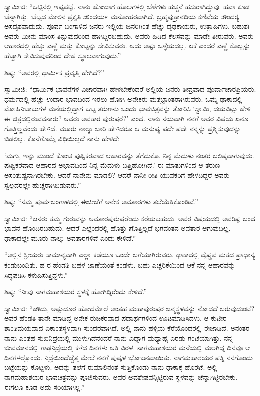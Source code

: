 \vskip 2pt

 ಸ್ವಾಮೀಜಿ: “ಒಟ್ಟಿನಲ್ಲಿ ಇಷ್ಟಪಟ್ಟೆ. ನಾನು ಹೋದಾಗ ಹೊಲಗಳಲ್ಲಿ ಬೆಳೆಗಳು ಹಚ್ಚನೆ ಹಸುರಾಗಿದ್ದುವು. ಹವಾ ಕೂಡ ಚೆನ್ನಾಗಿತ್ತು. ಬೆಟ್ಟದ ಮೇಲಿನ ಪ್ರಕೃತಿ ಸೌಂದರ್ಯ ಮನೋಹರವಾಗಿದೆ. ಬ್ರಹ್ಮಪುತ್ರಾನದಿಯ ಕಣಿವೆಯ ಸೌಂದರ‍್ಯ ಅಸದೃಶವಾದುದು. ಪೂರ್ವ ಬಂಗಾಳಿದ ಜನರು ಇಲ್ಲಿಯ ಜನರಿಗಿಂತ ಹೆಚ್ಚು ದೃಢಕಾಯರು, ಉತ್ಸಾಹಿಗಳು. ಬಹುಶಃ ಅವರು ಮೀನು ಮಾಂಸ ತಿನ್ನುವುದರಿಂದ ಹಾಗಿದ್ದಿರಬಹುದು. ಅವರು ಹಿಡಿದ ಕೆಲಸವನ್ನು ಮಾಡೇ ತೀರುವರು. ಅವರು ಆಹಾರದಲ್ಲಿ ಹೆಚ್ಚು ಎಣ್ಣೆ ಮತ್ತು ಕೊಬ್ಬನ್ನು ಸೇವಿಸುವರು. ಅದು ಅಷ್ಟು ಒಳ್ಳೆಯದಲ್ಲ. ಏಕೆ ಎಂದರೆ ಎಣ್ಣೆ ಕೊಬ್ಬನ್ನು ಹೆಚ್ಚಾಗಿ ಸೇವಿಸುವುದರಿಂದ ದೇಹ ಸ್ಥೂಲವಾಗುವುದು.” 

\vskip 2pt

 ಶಿಷ್ಯ: “ಅವರಲ್ಲಿ ಧಾರ್ಮಿಕ ಪ್ರವೃತ್ತಿ ಹೇಗಿದೆ?” 

\vskip 2pt

 ಸ್ವಾಮೀಜಿ: “ಧಾರ್ಮಿಕ ಭಾವನೆಗಳ ವಿಚಾರವಾಗಿ ಹೇಳಬೇಕೆಂದರೆ ಅಲ್ಲಿಯ ಜನರು ತೀವ್ರವಾದ ಪೂರ್ವಾಚಾರಪ್ರಿಯರು. ಧರ್ಮದಲ್ಲಿ ಹೆಚ್ಚು ಉದಾರ ಭಾವದಿಂದ ಇರಲು ಹೋಗಿ ಅನೇಕರು ಮತಭ್ರಾಂತರಾಗಿರುವರು. ಒಮ್ಮೆ ಢಾಕಾದಲ್ಲಿ ಮೋಹಿನಿಬಾಬುಗಳ ಮನೆಯಲ್ಲಿದ್ದಾಗ ಒಬ್ಬ ತರುಣನು ಒಂದು ಭಾವಚಿತ್ರವನ್ನು ತೋರಿಸಿ ‘ಸ್ವಾಮಿ, ದಯವಿಟ್ಟು ಹೇಳಿ ಈ ಚಿತ್ರದಲ್ಲಿರುವವನಾರು? ಅವರು ಅವತಾರ ಪುರುಷರೆ?’ ಎಂದ. ನಾನು ನಯವಾಗಿ ನನಗೆ ಅವರ ವಿಷಯ ಏನೂ ಗೊತ್ತಿಲ್ಲವೆಂದು ಹೇಳಿದೆ. ಮೂರು ನಾಲ್ಕು ಬಾರಿ ಹೇಳಿದರೂ ಆ ಮನುಷ್ಯ ಪದೇ ಪದೇ ನನ್ನನ್ನು ಪ್ರಶ್ನಿಸುವುದನ್ನು ಬಿಡಲಿಲ್ಲ. ಕೊನೆಗೊಮ್ಮೆ ವಿಧಿಯಿಲ್ಲದೆ ನಾನು ಹೇಳಿದೆ: 

\vskip 2pt

 ‘ಮಗು, ಇನ್ನು ಮುಂದೆ ಕೊಂಚ ಪುಷ್ಟಿಕರವಾದ ಆಹಾರವನ್ನು ತೆಗೆದುಕೊ. ನಿನ್ನ ಮೆದುಳು ನಂತರ ಬಲಿಷ್ಠವಾಗುವುದು. ಪುಷ್ಟಿಕರವಾದ ಆಹಾರದ ಅಭಾವದಿಂದ ನಿನ್ನ ಮೆದುಳು ಬತ್ತಿಹೋಗಿದೆ.’ ಈ ಮಾತುಗಳಿಂದ ಆ ತರುಣ ಅಸಂತುಷ್ಟನಾಗಿರಬೇಕು. ಆದರೆ ನಾನೇನು ಮಾಡಲಿ? ಆದರೆ ನಾನೀ ರೀತಿ ಯುವಕರಿಗೆ ಹೇಳದಿದ್ದರೆ ಅವರು ಸ್ವಲ್ಪದರಲ್ಲೇ ಹುಚ್ಚರಾಗಿಬಿಡುವರು.” 

 ಶಿಷ್ಯ: “ನಮ್ಮ ಪೂರ್ವಬಂಗಾಳದಲ್ಲಿ ಈಚೀಚೆಗೆ ಅನೇಕ ಅವತಾರಗಳು ತಲೆಯೆತ್ತಿಕೊಂಡಿವೆ.” 

 ಸ್ವಾಮೀಜಿ: “ಜನರು ತಮ್ಮ ಗುರುವನ್ನು ಅವತಾರಪುರುಷರೆಂದು ಕರೆಯಬಹುದು. ಅವರ ವಿಷಯದಲ್ಲಿ ಅವರಿಷ್ಟ ಬಂದ ಭಾವನೆ ಹೊಂದಿರಬಹುದು. ಆದರೆ ಎಲ್ಲೆಂದರಲ್ಲಿ ಹೊತ್ತು ಗೊತ್ತಿಲ್ಲದೆ ಭಗವಂತನ ಅವತಾರ ಆಗುವುದಿಲ್ಲ. ಢಾಕಾದಲ್ಲೇ ಮೂರು ನಾಲ್ಕು ಅವತಾರಗಳಿವೆ ಎಂದು ಕೇಳಿದೆ.” 

 “ಅಲ್ಲಿನ ಸ್ರೀಯರು ಸಾಮಾನ್ಯವಾಗಿ ಎಲ್ಲಾ ಕಡೆಯೂ ಒಂದೇ ಬಗೆಯಾಗಿರುವರು. ಢಾಕಾದಲ್ಲಿ ವೈಷ್ಣವ ಮತದ ಪ್ರಾಧಾನ್ಯ ಕಂಡುಬಂದಿತು. ಹ-ರ ಹೆಂಡತಿ ಬಹಳ ಜಾಣೆಯಂತೆ ಕಂಡಳು. ಬಹು ಎಚ್ಚರಿಕೆಯಿಂದ ಆಕೆ ನನ್ನ ಆಹಾರವನ್ನು ಸಿದ್ಧಪಡಿಸಿ ಕಳುಹಿಸುತ್ತಿದ್ದಳು.” 

 ಶಿಷ್ಯ: “ನೀವು ನಾಗಮಹಾಶಯರ ಸ್ಥಳಕ್ಕೆ ಹೋಗಿದ್ದಿರೆಂದು ಕೇಳಿದೆ.” 

 ಸ್ವಾಮೀಜಿ: “ಹೌದು, ಅಷ್ಟುದೂರ ಹೋದಮೇಲೆ ಅಂತಹ ಮಹಾಪುರುಷರ ಜನ್ಮಸ್ಥಳವನ್ನು ನೋಡದೆ ಬರುವುದುಂಟೆ? ಅವರ ಹೆಂಡತಿ ತಾನೇ ಮಾಡಿದ್ದ ಅನೇಕ ರುಚಿಕರವಾದ ಪದಾರ್ಥಗಳಿಂದ ಊಟಮಾಡಿಸಿದಳು. ಆ ಕುಟೀರ ಶಾಂತಿಮಯವಾದ ಏಕಾಂತಸ್ಥಳವಾಗಿ ಸುಂದರವಾಗಿದೆ. ಅಲ್ಲಿ ನಾನು ಹಳ್ಳಿಯ ಕೆರೆಯೊಂದರಲ್ಲಿ ಈಜಾಡಿದೆ. ಅನಂತರ ನಾನು ಎಂತಹ ಸುಖನಿದ್ರೆಯಲ್ಲಿ ಮುಳುಗಿದೆನೆಂದರೆ ನಾನು ಎದ್ದಾಗ ಮಧ್ಯಾಹ್ನ ಎರಡು ಗಂಟೆಯಾಗಿತ್ತು. ನನ್ನ ಜೀವಮಾನದಲ್ಲಿ ಗಾಢನಿದ್ರೆಯಲ್ಲಿ ಕಳೆದ ದಿನಗಳು ಅತಿ ವಿರಳ. ನಾಗಮಹಾಶಯರ ಮನೆಯಲ್ಲಿ ಮಲಗಿದ್ದ ದಿನವೂ ಆ ದಿನಗಳಲ್ಲೊಂದು. ನಿದ್ರೆಯಿಂದೆಚ್ಚೆತ್ತ ಮೇಲೆ ನನಗೆ ಪುಷ್ಕಳ ಭೋಜನವಾಯಿತು. ನಾಗಮಹಾಶಯರ ಪತ್ನಿ ನನಗೊಂದು ಬಟ್ಟೆಯನ್ನು ಕೊಟ್ಟಳು. ಅದನ್ನು ತಲೆಗೆ ರುಮಾಲಿನಂತೆ ಸುತ್ತಿಕೊಂಡು ನಾನು ಢಾಕಾಕ್ಕೆ ಹೊರಟೆ. ಅಲ್ಲಿ ನಾಗಮಹಾಶಯರ ಭಾವಚಿತ್ರವನ್ನು ಪೂಜಿಸುವರು. ಅವರ ಅವಶೇಷವನ್ನಿಟ್ಟಿರುವ ಸ್ಥಳವನ್ನು ಚೆನ್ನಾಗಿಟ್ಟಿರಬೇಕು. ಈಗಲೂ ಕೂಡ ಅದು ಸರಿಯಾಗಿಲ್ಲ.” 


